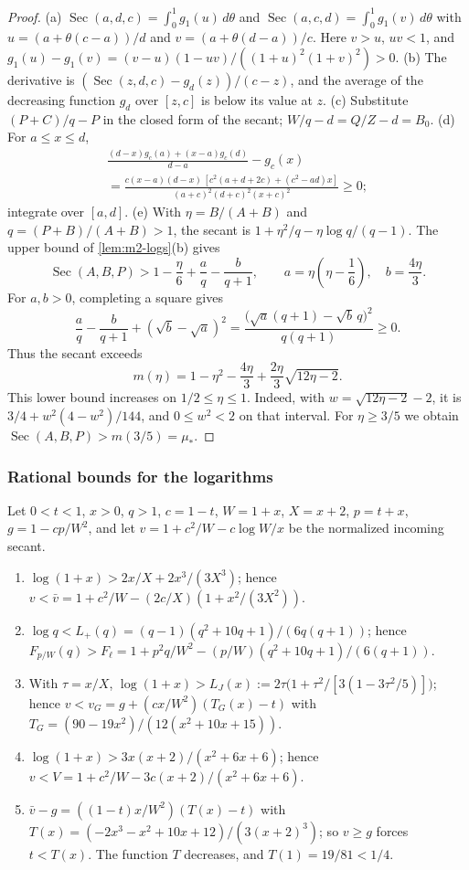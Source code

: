 \begin{proof}
(a) $\operatorname{Sec}(a,d,c)=\int_0^1g_1(u)\,d\theta$ and $\operatorname{Sec}(a,c,d)=\int_0^1g_1(v)\,d\theta$
with $u=(a+\theta(c-a))/d$ and $v=(a+\theta(d-a))/c$. Here $v>u$, $uv<1$, and
$g_1(u)-g_1(v)=(v-u)(1-uv)/((1+u)^2(1+v)^2)>0$.
(b) The derivative is $(\operatorname{Sec}(z,d,c)-g_d(z))/(c-z)$, and the average of the decreasing
function $g_d$ over $[z,c]$ is below its value at $z$.
(c) Substitute $(P+C)/q-P$ in the closed form of the secant; $W/q-d=Q/Z-d=B_0$.
(d) For $a\le x\le d$,
\begin{multline*}
\frac{(d-x)g_c(a)+(x-a)g_c(d)}{d-a}-g_c(x)\\
=\frac{c(x-a)(d-x)\,[c^2(a+d+2c)+(c^2-ad)x]}{(a+c)^2(d+c)^2(x+c)^2}\ge0;
\end{multline*}
integrate over $[a,d]$.
(e) With $\eta=B/(A+B)$ and $q=(P+B)/(A+B)>1$, the secant is
$1+\eta^2/q-\eta\log q/(q-1)$. The upper bound of \cref{lem:m2-logs}(b) gives
\[
 \operatorname{Sec}(A,B,P)>
 1-\frac\eta6+\frac{a}{q}-\frac{b}{q+1},\qquad
 a=\eta\left(\eta-\frac16\right),\quad b=\frac{4\eta}{3}.
\]
For $a,b>0$, completing a square gives
\[
 \frac{a}{q}-\frac{b}{q+1}+(\sqrt b-\sqrt a)^2
 =\frac{\bigl(\sqrt a(q+1)-\sqrt b\,q\bigr)^2}{q(q+1)}\ge0.
\]
Thus the secant exceeds
\[
 m(\eta)=1-\eta^2-\frac{4\eta}{3}+\frac{2\eta}{3}\sqrt{12\eta-2}.
\]
This lower bound increases on $1/2\le\eta\le1$. Indeed, with
$w=\sqrt{12\eta-2}-2$, it is $3/4+w^2(4-w^2)/144$, and $0\le w^2<2$ on that interval.
For $\eta\ge3/5$ we obtain
$\operatorname{Sec}(A,B,P)>m(3/5)=\mu_*$.
\end{proof}

\subsubsection{Rational bounds for the logarithms}\label{app:m2-logs}

\begin{lemma}[Logarithms]\label{lem:m2-logs}
Let $0<t<1$, $x>0$, $q>1$, $c=1-t$, $W=1+x$, $X=x+2$, $p=t+x$, $g=1-cp/W^2$, and let
$v=1+c^2/W-c\log W/x$ be the normalized incoming secant.
\begin{enumerate}[label=(\alph*)]
\item $\log(1+x)>2x/X+2x^3/(3X^3)$; hence $v<\bar v=1+c^2/W-(2c/X)(1+x^2/(3X^2))$.
\item $\log q<L_+(q)=(q-1)(q^2+10q+1)/(6q(q+1))$; hence
$F_{p/W}(q)>F_\ell=1+p^2q/W^2-(p/W)(q^2+10q+1)/(6(q+1))$.
\item With $\tau=x/X$,
$\log(1+x)>L_J(x):=2\tau\bigl(1+\tau^2/[3(1-3\tau^2/5)]\bigr)$; hence
$v<v_G=g+(cx/W^2)(T_G(x)-t)$ with $T_G=(90-19x^2)/(12(x^2+10x+15))$.
\item $\log(1+x)>3x(x+2)/(x^2+6x+6)$; hence $v<V=1+c^2/W-3c(x+2)/(x^2+6x+6)$.
\item $\bar v-g=((1-t)x/W^2)(T(x)-t)$ with $T(x)=(-2x^3-x^2+10x+12)/(3(x+2)^3)$; so $v\ge g$ forces
$t<T(x)$. The function $T$ decreases, and $T(1)=19/81<1/4$.
\end{enumerate}
\end{lemma}

